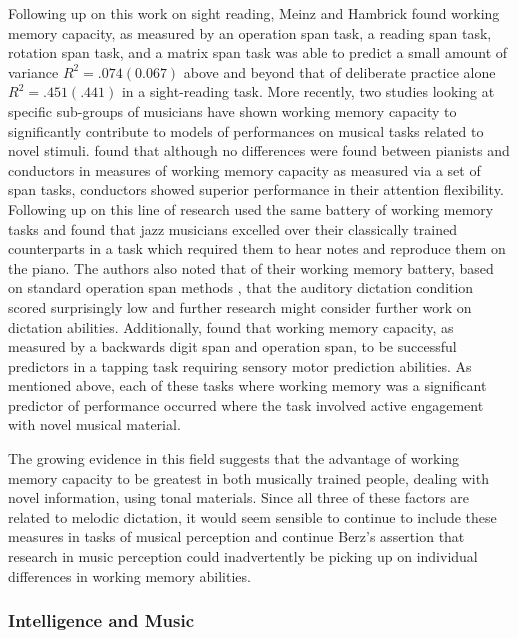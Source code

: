 \documentclass[]{book}
\begin{document}
Following up on this work on sight reading, Meinz and Hambrick \citep{meinzDeliberatePracticeNecessary2010} found working memory capacity, as measured by an operation span task, a reading span task, rotation span task, and a matrix span task was able to predict a small amount of variance \(R^2=.074(0.067)\) above and beyond that of deliberate practice alone \(R^2=.451(.441)\) in a sight-reading task.
More recently, two studies looking at specific sub-groups of musicians have shown working memory capacity to significantly contribute to models of performances on musical tasks related to novel stimuli.
\citet{wollnerAttentionalFlexibilityMemory2016} found that although no differences were found between pianists and conductors in measures of working memory capacity as measured via a set of span tasks, conductors showed superior performance in their attention flexibility.
Following up on this line of research \citet{nicholsScoreOneJazz2018} used the same battery of working memory tasks and found that jazz musicians excelled over their classically trained counterparts in a task which required them to hear notes and reproduce them on the piano.
The authors also noted that of their working memory battery, based on standard operation span methods \citep{engleWorkingMemoryCapacity2002}, that the auditory dictation condition scored surprisingly low and further research might consider further work on dictation abilities.
Additionally, \citet{colleyWorkingMemoryAuditory2018} found that working memory capacity, as measured by a backwards digit span and operation span, to be successful predictors in a tapping task requiring sensory motor prediction abilities.
As mentioned above, each of these tasks where working memory was a significant predictor of performance occurred where the task involved active engagement with novel musical material.

The growing evidence in this field suggests that the advantage of working memory capacity to be greatest in both musically trained people, dealing with novel information, using tonal materials.
Since all three of these factors are related to melodic dictation, it would seem sensible to continue to include these measures in tasks of musical perception and continue Berz's assertion that research in music perception could inadvertently be picking up on individual differences in working memory abilities.

\hypertarget{intelligence-and-music}{%
\subsubsection{Intelligence and Music}\label{intelligence-and-music}}
\end{document}
